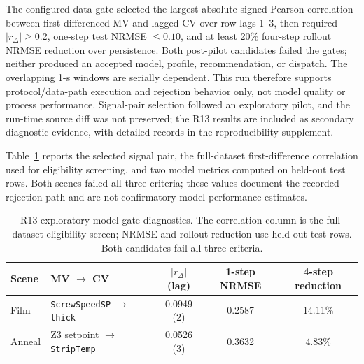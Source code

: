 The configured data gate selected the largest absolute signed Pearson
correlation between first-differenced MV and lagged CV over row lags 1--3,
then required $|r_{\Delta}|\geq0.2$, one-step test NRMSE $\leq0.10$, and at
least 20\% four-step rollout NRMSE reduction over persistence. Both
post-pilot candidates failed the gates; neither produced an accepted model,
profile, recommendation, or dispatch. The overlapping 1-s windows are
serially dependent. This run therefore supports protocol/data-path execution
and rejection behavior only, not model quality or process performance.
Signal-pair selection followed an exploratory pilot, and the run-time source
diff was not preserved; the R13 results are included as secondary diagnostic
evidence, with detailed records in the reproducibility supplement.

Table~\ref{tab:r13gates} reports the selected signal pair, the full-dataset
first-difference correlation used for eligibility screening, and two model
metrics computed on held-out test rows. Both scenes failed all three criteria;
these values document the recorded rejection path and are not confirmatory
model-performance estimates.
\begin{table}[!t]
\centering
\caption{R13 exploratory model-gate diagnostics. The correlation column is
the full-dataset eligibility screen; NRMSE and rollout reduction use held-out
test rows. Both candidates fail all three criteria.}
\label{tab:r13gates}
\footnotesize
\setlength{\tabcolsep}{2.2pt}
\begin{tabularx}{\columnwidth}{@{}lXccc@{}}
\toprule
Scene & MV $\to$ CV & $|r_{\Delta}|$ (lag) & 1-step NRMSE & 4-step reduction \\
\midrule
Film & \shortstack[l]{\texttt{ScrewSpeedSP}\\$\to$ \texttt{thick}} & 0.0949 (2) & 0.2587 & 14.11\% \\
Anneal & \shortstack[l]{Z3 setpoint\\$\to$ \texttt{StripTemp}} & 0.0526 (3) & 0.3632 & 4.83\% \\
\bottomrule
\end{tabularx}
\end{table}
